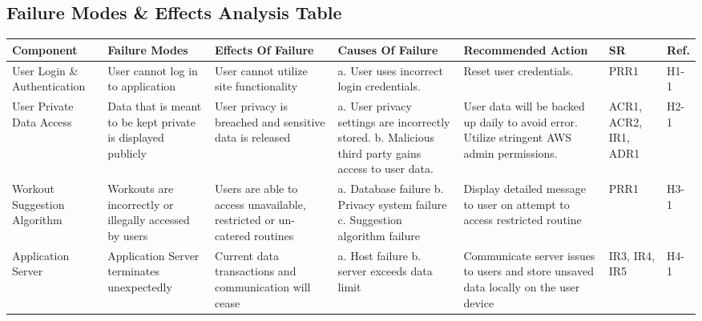 \documentclass{article}
\begin{document}
	\subsection{Failure Modes \& Effects Analysis Table}
	\begin{adjustwidth}{-3cm}{-1cm}
	\centering
	\noindent\begin{tabular}{ |p{3.3cm}|p{2.5cm}|p{3.2cm}|p{2cm}|p{2.5cm}|p{1cm}|p{1cm}| @{} }
		\hline
		Component & Failure Modes & Effects Of Failure & Causes Of Failure & Recommended Action & SR & Ref.\\
		\hline
		User Login \& Authentication& User cannot log in to application & User cannot utilize site functionality & 
			a. User uses incorrect login credentials.
			& 
			Reset user credentials.
			& PRR1 & H1-1\\
		\hline
		User Private Data Access & Data that is meant to be kept private is displayed publicly & 
			User privacy is breached and sensitive data is released & 
				a. User privacy settings are incorrectly stored.
				\newline
				b. Malicious third party gains access to user data.
			& 
				User data will be backed up daily to avoid error. Utilize stringent AWS admin permissions.
			& ACR1, ACR2, IR1, ADR1 & H2-1\\
		\hline
		Workout Suggestion Algorithm& Workouts are incorrectly or illegally accessed by users& Users are able to access unavailable, restricted or un-catered routines & a. Database failure \newline b. Privacy system failure \newline c. Suggestion algorithm failure & Display detailed message to user on attempt to access restricted routine & PRR1 &H3-1\\
		\hline
		Application Server& Application Server terminates unexpectedly & Current data transactions and communication will cease& a. Host failure \newline b. server exceeds data limit& Communicate server issues to users and store unsaved data locally on the user device & IR3, IR4, IR5 & H4-1 \\
		\hline

 	\end{tabular}


\end{adjustwidth}
\end{document}
